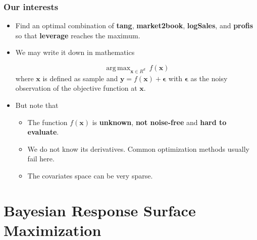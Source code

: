 \documentclass[11pt]{beamer}
\DeclareMathOperator*{\argmax}{arg\,max}
\begin{document}
\begin{frame}
  \frametitle{Our interests}

  \begin{itemize}
  \item Find an optimal combination of \textbf{tang},
    \textbf{market2book}, \textbf{logSales}, and \textbf{profis} so
    that \textbf{leverage} reaches the maximum.

  \item We may write it down in mathematics

    \begin{equation*}
      \argmax_{\bm{x} \in R^d} ~ f(\bm{x})
    \end{equation*}
    where $ \bm{x}$ is defined as sample and $\bm{y} = f (\bm{x}) +
    \bm{\epsilon} $ with $\bm{\epsilon}$ as the noisy observation of
    the objective function at $\bm{x}$.

  \item But note that

    \begin{itemize}
    \item The function $f(\bm{x})$ is \textbf{unknown}, \textbf{not
        noise-free} and \textbf{hard to evaluate}.
    \item We do not know its derivatives. Common optimization methods
      usually fail here.
    \item The covariates space can be very sparse.
    \end{itemize}

  \end{itemize}

\end{frame}

\section{Bayesian Response Surface Maximization}
\end{document}
